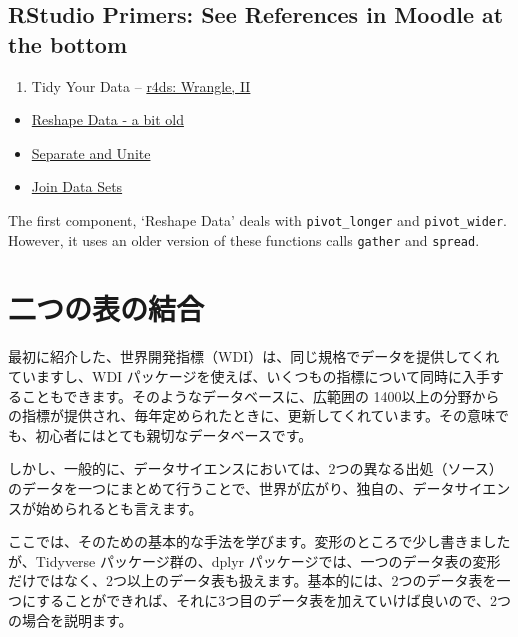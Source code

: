 \documentclass[
  xelatex, ja=standard]{bxjsbook}
\providecommand{\tightlist}{%
  \setlength{\itemsep}{0pt}\setlength{\parskip}{0pt}}
\theoremstyle{definition}
\theoremstyle{definition}
\theoremstyle{definition}
\theoremstyle{definition}
\theoremstyle{remark}
\begin{document}
\hypertarget{rstudio-primers-see-references-in-moodle-at-the-bottom}{%
\subsection{RStudio Primers: See References in Moodle at the bottom}\label{rstudio-primers-see-references-in-moodle-at-the-bottom}}

\begin{enumerate}
\def\labelenumi{\arabic{enumi}.}
\setcounter{enumi}{3}
\tightlist
\item
  Tidy Your Data -- \href{https://r4ds.had.co.nz/wrangle-intro.html\#wrangle-intro}{r4ds: Wrangle, II}
\end{enumerate}

\begin{itemize}
\tightlist
\item
  \href{https://rstudio.cloud/learn/primers/4.1}{Reshape Data - a bit old}
\item
  \href{https://rstudio.cloud/learn/primers/4.2}{Separate and Unite}
\item
  \href{https://rstudio.cloud/learn/primers/4.3}{Join Data Sets}
\end{itemize}

The first component, `Reshape Data' deals with \texttt{pivot\_longer} and \texttt{pivot\_wider}. However, it uses an older version of these functions calls \texttt{gather} and \texttt{spread}.

\hypertarget{ux4e8cux3064ux306eux8868ux306eux7d50ux5408}{%
\section{二つの表の結合}\label{ux4e8cux3064ux306eux8868ux306eux7d50ux5408}}

最初に紹介した、世界開発指標（WDI）は、同じ規格でデータを提供してくれていますし、WDI パッケージを使えば、いくつもの指標について同時に入手することもできます。そのようなデータベースに、広範囲の 1400以上の分野からの指標が提供され、毎年定められたときに、更新してくれています。その意味でも、初心者にはとても親切なデータベースです。

しかし、一般的に、データサイエンスにおいては、2つの異なる出処（ソース）のデータを一つにまとめて行うことで、世界が広がり、独自の、データサイエンスが始められるとも言えます。

ここでは、そのための基本的な手法を学びます。変形のところで少し書きましたが、Tidyverse パッケージ群の、dplyr パッケージでは、一つのデータ表の変形だけではなく、2つ以上のデータ表も扱えます。基本的には、2つのデータ表を一つにすることができれば、それに3つ目のデータ表を加えていけば良いので、2つの場合を説明ます。
\end{document}
